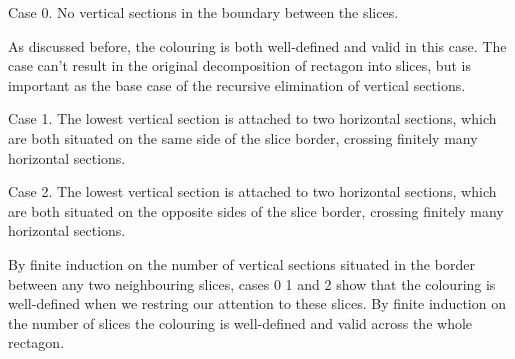 Case 0. No vertical sections in the boundary between the slices.

As discussed before, the colouring is both well-defined and valid in this case. The case can't result in the original decomposition of rectagon into slices, but is important as the base case of the recursive elimination of vertical sections.

Case 1. The lowest vertical section is attached to two horizontal sections, which are both situated on the same side of the slice border, crossing finitely many horizontal sections.

Case 2. The lowest vertical section is attached to two horizontal sections, which are both situated on the opposite sides of the slice border, crossing finitely many horizontal sections.

By finite induction on the number of vertical sections situated in the border between any two neighbouring slices, cases 0 1 and 2 show that the colouring is well-defined when we restring our attention to these slices. By finite induction on the number of slices the colouring is well-defined and valid across the whole rectagon.
